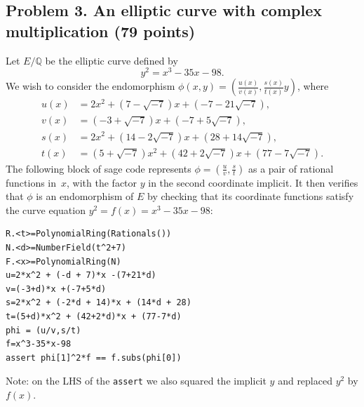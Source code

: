 \documentclass[11pt]{article}
\newcommand{\Q}{\mathbb{Q}}
\begin{document}
\subsection*{Problem 3. An elliptic curve with complex multiplication (79 points)}
Let $E/\Q$ be the elliptic curve defined by
\[
y^2 = x^3-35x-98.
\]
We wish to consider the endomorphism $\phi(x,y)=\left(\frac{u(x)}{v(x)},\frac{s(x)}{t(x)}y\right)$, where
\begin{align*}
u(x) &= 2x^2 + (7 - \sqrt{-7})x + (-7 - 21\sqrt{-7}),\\
v(x) &=(-3+\sqrt{-7})x + (-7+5\sqrt{-7}),\\
s(x) &= 2x^2 + (14-2\sqrt{-7})x + (28+14\sqrt{-7}),\\
t(x) &= (5+\sqrt{-7})x^2 + (42+2\sqrt{-7})x + (77 - 7\sqrt{-7}).
\end{align*}
The following block of sage code represents $\phi=(\frac{u}{v},\frac{s}{t})$ as a pair of rational functions in~$x$, with the factor $y$ in the second coordinate implicit.
It then verifies that $\phi$ is an endomorphism of $E$ by checking that its coordinate functions satisfy the curve equation $y^2=f(x)=x^3-35x-98$:
\begin{lstlisting}
R.<t>=PolynomialRing(Rationals())
N.<d>=NumberField(t^2+7)
F.<x>=PolynomialRing(N)
u=2*x^2 + (-d + 7)*x -(7+21*d)
v=(-3+d)*x +(-7+5*d)
s=2*x^2 + (-2*d + 14)*x + (14*d + 28)
t=(5+d)*x^2 + (42+2*d)*x + (77-7*d)
phi = (u/v,s/t)
f=x^3-35*x-98
assert phi[1]^2*f == f.subs(phi[0])
\end{lstlisting}
Note: on the LHS of the \texttt{assert} we also squared the implicit $y$ and replaced $y^2$ by $f(x)$.
\end{document}
